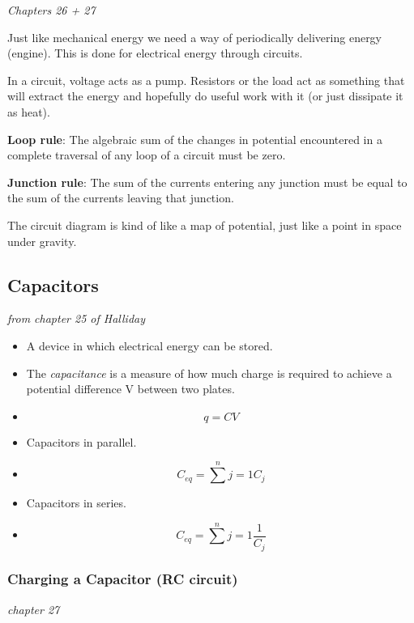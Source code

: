 \documentclass[11pt]{article}
\begin{document}
\emph{Chapters 26 + 27}

Just like mechanical energy we need a way of periodically delivering
energy (engine). This is done for electrical energy through circuits.

In a circuit, voltage acts as a pump. Resistors or the load act as
something that will extract the energy and hopefully do useful work with
it (or just dissipate it as heat).

\textbf{Loop rule}: The algebraic sum of the changes in potential
encountered in a complete traversal of any loop of a circuit must be
zero.

\textbf{Junction rule}: The sum of the currents entering any junction
must be equal to the sum of the currents leaving that junction.

The circuit diagram is kind of like a map of potential, just like a
point in space under gravity.

\hypertarget{capacitors}{%
\subsection{Capacitors}\label{capacitors}}

\emph{from chapter 25 of Halliday}

\begin{itemize}
\tightlist
\item
  A device in which electrical energy can be stored.
\item
  The \emph{capacitance} is a measure of how much charge is required to
  achieve a potential difference V between two plates.
\item
  \[q = CV\]
\item
  Capacitors in parallel.
\item
  \[C_{eq} = \sum^n{j = 1}C_j\]
\item
  Capacitors in series.
\item
  \[C_{eq} = \sum^n{j = 1}\frac{1}{C_j}\]
\end{itemize}

\hypertarget{charging-a-capacitor-rc-circuit}{%
\subsubsection{Charging a Capacitor (RC
circuit)}\label{charging-a-capacitor-rc-circuit}}

\emph{chapter 27}
\end{document}
